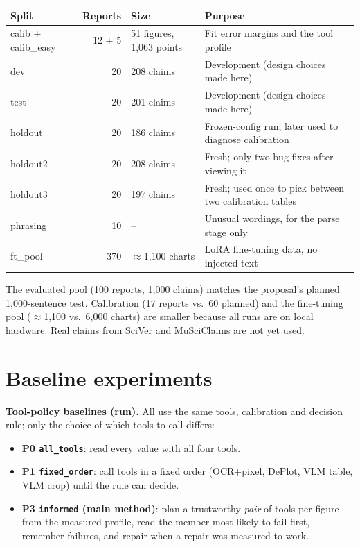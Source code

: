 \documentclass[11pt,a4paper]{article}
\newcommand{\code}[1]{\texttt{\small #1}}
\begin{document}
\begin{center}\small
\begin{tabularx}{\linewidth}{lrlX}
\toprule
Split & Reports & Size & Purpose \\
\midrule
calib + calib\_easy & 12 + 5 & 51 figures, 1{,}063 points & Fit error margins and the tool profile \\
dev & 20 & 208 claims & Development (design choices made here) \\
test & 20 & 201 claims & Development (design choices made here) \\
holdout & 20 & 186 claims & Frozen-config run, later used to diagnose calibration \\
holdout2 & 20 & 208 claims & Fresh; only two bug fixes after viewing it \\
holdout3 & 20 & 197 claims & Fresh; used once to pick between two calibration tables \\
phrasing & 10 & -- & Unusual wordings, for the parse stage only \\
ft\_pool & 370 & $\approx$1{,}100 charts & LoRA fine-tuning data, no injected text \\
\bottomrule
\end{tabularx}
\end{center}

The evaluated pool (100 reports, 1{,}000 claims) matches the proposal's planned 1{,}000-sentence test. Calibration (17 reports vs.\ 60 planned) and the fine-tuning pool ($\approx$1{,}100 vs.\ 6{,}000 charts) are smaller because all runs are on local hardware. Real claims from SciVer and MuSciClaims are not yet used.

\section{Baseline experiments}

\textbf{Tool-policy baselines (run).} All use the same tools, calibration and decision rule; only the choice of which tools to call differs:
\begin{itemize}
\item \textbf{P0 \code{all\_tools}}: read every value with all four tools.
\item \textbf{P1 \code{fixed\_order}}: call tools in a fixed order (OCR+pixel, DePlot, VLM table, VLM crop) until the rule can decide.
\item \textbf{P3 \code{informed} (main method)}: plan a trustworthy \emph{pair} of tools per figure from the measured profile, read the member most likely to fail first, remember failures, and repair when a repair was measured to work.
\end{itemize}
\end{document}
